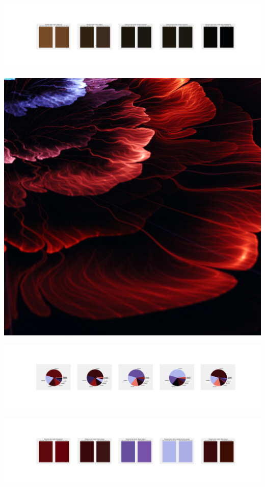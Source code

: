 \documentclass[11pt]{article}
\begin{document}
\begin{landscape}
    \begin{center}
    \includegraphics[width=250mm]{./nbimg/peak-19.jpg}
    \end{center}
    

    \begin{center}
    \includegraphics[width=\textwidth]{./nbimg/file (117).jpg}
    \end{center}

    \begin{center}
    \includegraphics[width=250mm]{./nbimg/pie-20.jpg}
    \end{center}

    \begin{center}
    \includegraphics[width=250mm]{./nbimg/peak-20.jpg}
    \end{center}
    


\end{landscape}
\end{document}
